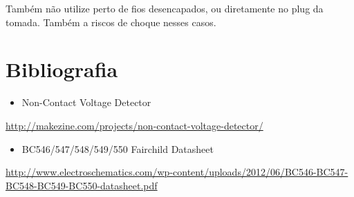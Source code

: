 Também não utilize perto de fios desencapados, ou diretamente no plug da
tomada. Também a riscos de choque nesses casos.

\section{Bibliografia}\label{bibliografia}

\begin{itemize}
\itemsep1pt\parskip0pt
\item
  Non-Contact Voltage Detector
\end{itemize}

\url{http://makezine.com/projects/non-contact-voltage-detector/}

\begin{itemize}
\itemsep1pt\parskip0pt
\item
  BC546/547/548/549/550 Fairchild Datasheet
\end{itemize}

\url{http://www.electroschematics.com/wp-content/uploads/2012/06/BC546-BC547-BC548-BC549-BC550-datasheet.pdf}
